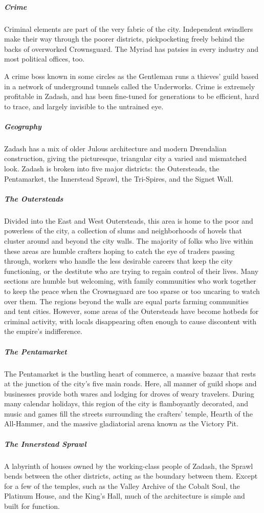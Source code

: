 \documentclass[10pt,a4paper,twoside,bg=print,twocolumn,openany,nodeprecatedcode]{dndbook}
\begin{document}
\subparagraph{Crime}
Criminal elements are part of the very fabric of the city. Independent swindlers make their way through the poorer districts, pickpocketing freely behind the backs of overworked Crownsguard. The Myriad has patsies in every industry and most political offices, too.

A crime boss known in some circles as the Gentleman runs a thieves' guild based in a network of underground tunnels called the Underworks. Crime is extremely profitable in Zadash, and has been fine-tuned for generations to be efficient, hard to trace, and largely invisible to the untrained eye.

\subparagraph{Geography}
Zadash has a mix of older Julous architecture and modern Dwendalian construction, giving the picturesque, triangular city a varied and mismatched look. Zadash is broken into five major districts: the Outersteads, the Pentamarket, the Innerstead Sprawl, the Tri-Spires, and the Signet Wall.

\subparagraph{The Outersteads}
Divided into the East and West Outersteads, this area is home to the poor and powerless of the city, a collection of slums and neighborhoods of hovels that cluster around and beyond the city walls. The majority of folks who live within these areas are humble crafters hoping to catch the eye of traders passing through, workers who handle the less desirable careers that keep the city functioning, or the destitute who are trying to regain control of their lives. Many sections are humble but welcoming, with family communities who work together to keep the peace when the Crownsguard are too sparse or too uncaring to watch over them. The regions beyond the walls are equal parts farming communities and tent cities. However, some areas of the Outersteads have become hotbeds for criminal activity, with locals disappearing often enough to cause discontent with the empire's indifference.

\subparagraph{The Pentamarket}
The Pentamarket is the bustling heart of commerce, a massive bazaar that rests at the junction of the city's five main roads. Here, all manner of guild shops and businesses provide both wares and lodging for droves of weary travelers. During many calendar holidays, this region of the city is flamboyantly decorated, and music and games fill the streets surrounding the crafters' temple, Hearth of the All-Hammer, and the massive gladiatorial arena known as the Victory Pit.

\subparagraph{The Innerstead Sprawl}
A labyrinth of houses owned by the working-class people of Zadash, the Sprawl bends between the other districts, acting as the boundary between them. Except for a few of the temples, such as the Valley Archive of the Cobalt Soul, the Platinum House, and the King's Hall, much of the architecture is simple and built for function.
\end{document}
